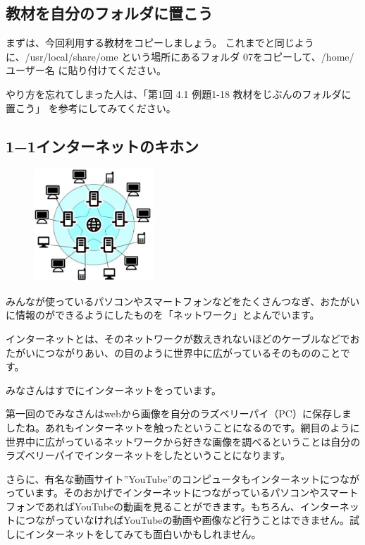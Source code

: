 \documentclass[a4paper,12pt,dvipdfmx]{jarticle}
\begin{document}
\begin{description}
\end{description}

\clearpage\subsection*{教材を自分のフォルダに置こう}
まずは、今回利用する教材をコピーしましょう。
これまでと同じように、/usr/local/share/ome という場所にあるフォルダ 07をコピーして、/home/ユーザー名 に貼り付けてください。

やり方を忘れてしまった人は、「第1回 4.1 例題1-18 教材をじぶんのフォルダに置こう」 を参考にしてみてください。

\subsection*{1−1インターネットのキホン}
\begin{figure}
	\includegraphics[width=0.4\textwidth]{ome7-img002.eps}
\end{figure}

みんなが使っているパソコンやスマートフォンなどをたくさんつなぎ、おたがいに情報のができるようにしたものを「ネットワーク」とよんでいます。

インターネットとは、そのネットワークが数えきれないほどのケーブルなどでおたがいにつながりあい、の目のように世界中に広がっているそのもののことです。


\bigskip

みなさんはすでにインターネットをっています。

第一回のでみなさんはwebから画像を自分のラズベリーパイ（PC）に保存しましたね。あれもインターネットを触ったということになるのです。網目のように世界中に広がっているネットワークから好きな画像を調べるということは自分のラズベリーパイでインターネットをしたということになります。

さらに、有名な動画サイト”YouTube”のコンピュータもインターネットにつながっています。そのおかげでインターネットにつながっているパソコンやスマートフォンであればYouTubeの動画を見ることができます。もちろん、インターネットにつながっていなければYouTubeの動画や画像など行うことはできません。試しにインターネットをしてみても面白いかもしれません。
\end{document}
